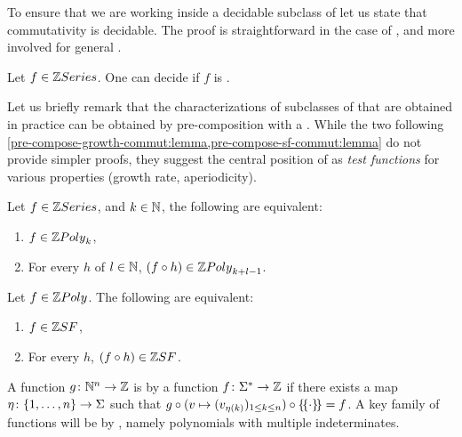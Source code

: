 To ensure that we are working inside a decidable subclass of 
let us state that commutativity is decidable. The proof is straightforward in the case
of , and more involved for general .

\begin{lemma}
    \label{decidable-commutative-poly:lemma}
    \label{decidable-commutative-rat:lemma}
    Let $f \in \ZRat$. One can decide if 
    $f$
    is .
\end{lemma}

Let us briefly remark that the characterizations of subclasses of
 that are obtained in practice can be obtained by
pre-composition with a  . While the
two following
\cref{pre-compose-growth-commut:lemma,pre-compose-sf-commut:lemma} do not
provide simpler proofs, they suggest the central position of 
 as \emph{test functions} for various
properties (growth rate, aperiodicity).

\begin{lemma}
    \label{pre-compose-growth-commut:lemma}
    Let $f \in \ZRat$, and $k \in \mathbb{N}$,
    the following are equivalent:
    \begin{enumerate}
        \item $f \in \ZPoly[k]$,
        \item For every   $h$
            of  $l \in \mathbb{N}$,
            $(f \circ h) \in \ZPoly[k+l-1]$.
    \end{enumerate}
\end{lemma}


\begin{lemma}
    \label{pre-compose-sf-commut:lemma}
    Let $f \in \ZPoly$.
    The following are equivalent:
    \begin{enumerate}
        \item $f \in \ZSF$,
        \item For every   $h$,
            $(f \circ h) \in \ZSF$.
    \end{enumerate}
\end{lemma}

\AP A function $g \colon \mathbb{N}^n \to \mathbb{Z}$ is  by a function
$f \colon \Sigma^* \to \mathbb{Z}$ if there exists a map $\eta \colon \mathopen{\{} 1, \dots,
n \mathclose{\}} \to \Sigma$ such that $g \circ (v \mapsto \seqof{v_{\eta(k)}}{1 \leq k \leq
n}) \circ \commute = f$. A key family of functions will be  by
, namely polynomials with multiple indeterminates.

